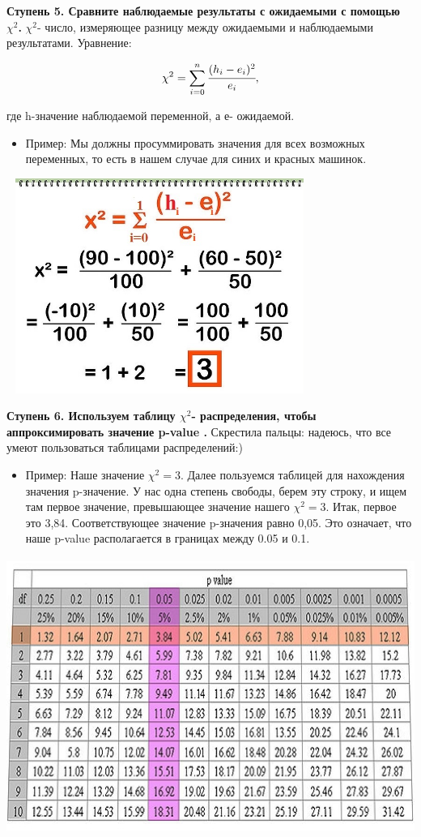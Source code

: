 \documentclass[a4paper,12pt]{article}
\begin{document}
\textbf{Ступень 5. Сравните наблюдаемые результаты с ожидаемыми с помощью $\chi^2$.} $\chi^2$- число, измеряющее разницу между ожидаемыми и наблюдаемыми результатами. Уравнение: 

$$\chi^2=\sum_{i=0}^{n} \cfrac {(h_i-e_i)^2}{e_i},$$

где h-значение наблюдаемой переменной, а е- ожидаемой.

\begin{itemize}
  \item Пример: Мы должны просуммировать значения для всех возможных переменных, то есть в нашем случае для синих и красных машинок.
\end{itemize}

\includegraphics[width=100mm,height=70mm]{4.jpg}


\textbf{Ступень 6. Используем таблицу $\chi^2$- распределения, чтобы аппроксимировать значение p-value .} Скрестила пальцы: надеюсь, что все умеют пользоваться таблицами распределений:)

\begin{itemize}
  \item Пример: Наше значение $\chi^2=3$. Далее пользуемся таблицей для нахождения значения p-значение. У нас одна степень свободы, берем эту строку, и ищем там первое значение, превышающее значение нашего $\chi^2=3$. Итак, первое это 3,84. Соответствующее значение p-значения равно 0,05. Это означает, что наше p-value располагается в границах между 0.05 и 0.1.
      \end{itemize}

  \includegraphics[width=150mm,height=90mm]{6.jpg}
\end{document}
